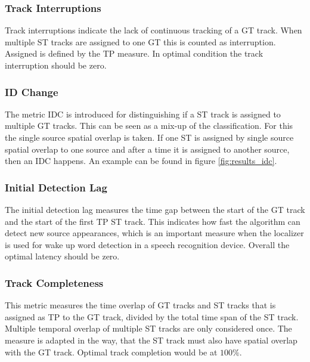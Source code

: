 \subsubsection{Track Interruptions}
Track interruptions indicate the lack of continuous tracking of a \ac{GT} track. When multiple \ac{ST} tracks are assigned to one \ac{GT} this is counted as interruption. Assigned is defined by the \ac{TP} measure. In optimal condition the track interruption should be zero.

\subsubsection{ID Change}

The metric \ac{IDC} is introduced for distinguishing if a \ac{ST} track is assigned to multiple \ac{GT} tracks. This can be seen as a mix-up of the classification. For this the single source spatial overlap is taken. If one \ac{ST} is assigned by single source spatial overlap to one source and after a time it is assigned to another source, then an \ac{IDC} happens. An example can be found in figure \ref{fig:results_idc}.

\subsubsection{Initial Detection Lag}
The initial detection lag measures the time gap between the start of the \ac{GT} track and the start of the first \ac{TP} \ac{ST} track. This indicates how fast the algorithm can detect new source appearances, which is an important measure when the localizer is used for wake up word detection in a speech recognition device. Overall the optimal latency should be zero.

\subsubsection{Track Completeness}
This metric measures the time overlap of \ac{GT} tracks and \ac{ST} tracks that is assigned as \ac{TP} to the \ac{GT} track, divided by the total time span of the \ac{ST} track. Multiple temporal overlap of multiple \ac{ST} tracks are only considered once. The measure is adapted in the way, that the \ac{ST} track must also have spatial overlap with the \ac{GT} track. Optimal track completion would be at $100\%$.

